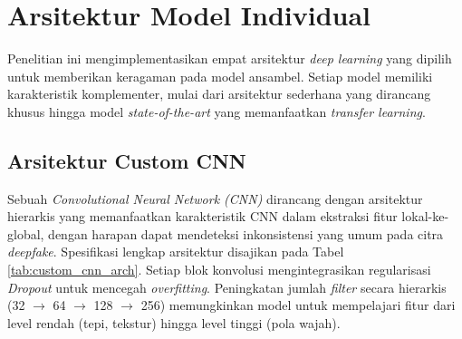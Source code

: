 \section{Arsitektur Model Individual}

Penelitian ini mengimplementasikan empat arsitektur \textit{deep learning} yang dipilih untuk memberikan keragaman pada model ansambel. Setiap model memiliki karakteristik komplementer, mulai dari arsitektur sederhana yang dirancang khusus hingga model \textit{state-of-the-art} yang memanfaatkan \textit{transfer learning}.

\subsection{Arsitektur Custom CNN}

Sebuah \textit{Convolutional Neural Network (CNN)} dirancang dengan arsitektur hierarkis yang memanfaatkan karakteristik CNN dalam ekstraksi fitur lokal-ke-global, dengan harapan dapat mendeteksi inkonsistensi yang umum pada citra \textit{deepfake}. Spesifikasi lengkap arsitektur disajikan pada Tabel \ref{tab:custom_cnn_arch}. Setiap blok konvolusi mengintegrasikan regularisasi \textit{Dropout} untuk mencegah \textit{overfitting}. Peningkatan jumlah \textit{filter} secara hierarkis (32 $\rightarrow$ 64 $\rightarrow$ 128 $\rightarrow$ 256) memungkinkan model untuk mempelajari fitur dari level rendah (tepi, tekstur) hingga level tinggi (pola wajah).

